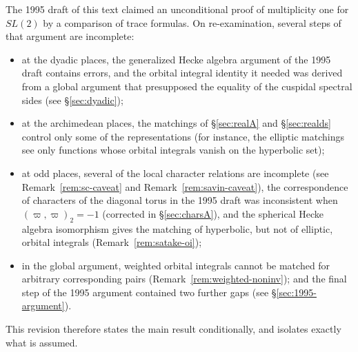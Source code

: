 \documentclass[12pt,letterpaper]{book}
\theoremstyle{plain}
\theoremstyle{definition}
\theoremstyle{remark}
\theoremstyle{remark}
\begin{document}
The 1995 draft of this text claimed an unconditional proof of
multiplicity one for $SL(2)$ by a comparison of trace formulas.
On re-examination, several steps of that argument are incomplete:
\begin{itemize}
\item at the dyadic places, the generalized Hecke algebra argument of the
1995 draft contains errors, and the orbital integral identity it
needed was derived from a global argument that presupposed the
equality of the cuspidal spectral sides (see \S\ref{sec:dyadic});
\item at the archimedean places, the matchings of \S\ref{sec:realA} and
\S\ref{sec:realds} control only some of the representations
(for instance, the elliptic matchings see only functions whose
orbital integrals vanish on the hyperbolic set);
\item at odd places, several of the local character relations are
incomplete (see Remark~\ref{rem:sc-caveat} and
Remark~\ref{rem:savin-caveat}), the correspondence of characters of
the diagonal torus in the 1995 draft was inconsistent when
$(\varpi,\varpi)_2=-1$ (corrected in \S\ref{sec:charsA}), and the
spherical Hecke algebra isomorphism gives the matching of hyperbolic,
but not of elliptic, orbital integrals (Remark~\ref{rem:satake-oi});
\item in the global argument, weighted orbital integrals cannot be
matched for arbitrary corresponding pairs
(Remark~\ref{rem:weighted-noninv}); and the final step of the 1995
argument contained two further gaps (see \S\ref{sec:1995-argument}).
\end{itemize}
This revision therefore states the main result conditionally, and
isolates exactly what is assumed.
\end{document}
